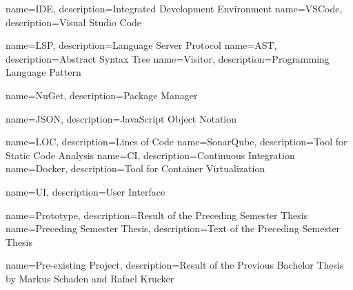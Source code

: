 {
	name=IDE,
	description={Integrated Development Environment}
}
{
	name=VSCode,
	description={Visual Studio Code}
}

{
	name=LSP,
	description={Language Server Protocol}
}
{
	name=AST,
	description={Abstract Syntax Tree}
}
{
	name=Visitor,
	description={Programming Language Pattern}
}

{
	name=NuGet,
	description={Package Manager}
}

{
	name=JSON,
	description={JavaScript Object Notation}
}

{
	name=LOC,
	description={Lines of Code}
}
{
	name=SonarQube,
	description={Tool for Static Code Analysis}
}
{
	name=CI,
	description={Continuous Integration}
}
{
	name=Docker,
	description={Tool for Container Virtualization}
}

{
	name=UI,
	description={User Interface}
}

{
	name=Prototype,
	description={Result of the Preceding Semester Thesis}
}
{
	name=Preceding Semester Thesis,
	description={Text of the Preceding Semester Thesis}
}

{
	name=Pre-existing Project,
	description={Result of the Previous Bachelor Thesis by Markus Schaden and Rafael Krucker}
}





